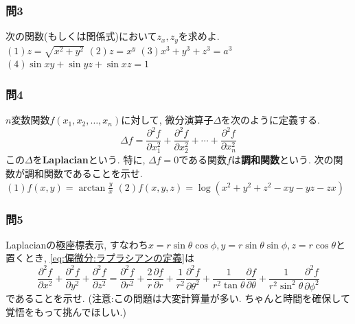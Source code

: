 \documentclass[a4j,dvipdfmx]{jsarticle}
\numberwithin{equation}{section}
\begin{document}
        \subsubsection*{問3}次の関数(もしくは関係式)において$z_x,z_y$を求めよ.\\
            $(1)z=\sqrt{x^2+y^2}$\hspace{1mm}
            $(2)z=x^{y}$\hspace{1mm}
            $(3)x^3+y^3+z^3=a^3$\hspace{1mm}
            $(4)\sin xy+\sin yz+ \sin xz = 1$
        
        \subsubsection*{問4}$n$変数関数$f(x_1,x_2,\dots,x_n)$に対して, 微分演算子$\Delta$を次のように定義する.
            \begin{equation}
                \Delta f = \frac{\partial^2f}{\partial x_1^2}+\frac{\partial^2f}{\partial x_2^2}+\cdots+\frac{\partial^2f}{\partial x_n^2} \label{eq:偏微分:ラプラシアンの定義}
            \end{equation}
            この$\Delta$を\textbf{Laplacian}という. 特に, $\Delta f= 0$である関数$f$は\textbf{調和関数}という.
            次の関数が調和関数であることを示せ.\\
            $\displaystyle(1)f(x,y)=\arctan\frac{y}{x}$\hspace{10mm}
            $(2)f(x,y,z)=\log(x^2+y^2+z^2-xy-yz-zx)$

        \subsubsection*{問5}Laplacianの極座標表示, すなわち$x=r\sin\theta\cos\phi,y=r\sin\theta\sin\phi,z=r\cos\theta$と置くとき, \eqref{eq:偏微分:ラプラシアンの定義}は
        \begin{equation}
            \frac{\partial^2 f}{\partial x^2}+\frac{\partial^2 f}{\partial y^2}+\frac{\partial^2 f}{\partial z^2}=\frac{\partial^2 f}{\partial r^2}+\frac{2}{r}\frac{\partial f}{\partial r}+
            \frac{1}{r^2}\frac{\partial^2 f}{\partial\theta^2}+\frac{1}{r^2\tan\theta}\frac{\partial f}{\partial\theta}+\frac{1}{r^2\sin^2\theta}\frac{\partial^2 f}{\partial\phi^2} \label{eq:偏微分:ラプラシアンの極座標変換}
        \end{equation}
        であることを示せ. ({\small\color{red}注意:この問題は大変計算量が多い. ちゃんと時間を確保して覚悟をもって挑んでほしい.})
\end{document}
